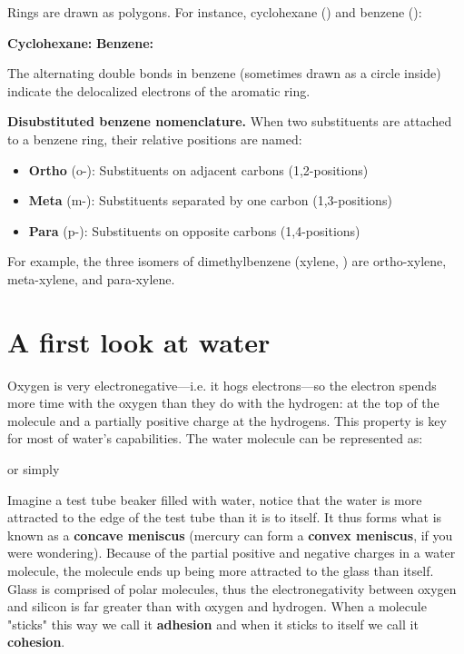 \documentclass{report}
\begin{document}
Rings are drawn as polygons. For instance, cyclohexane () and benzene ():
\begin{center}
\textbf{Cyclohexane:}  \qquad
\textbf{Benzene:} 
\end{center}
The alternating double bonds in benzene (sometimes drawn as a circle inside) indicate the delocalized electrons of the aromatic ring.

\textbf{Disubstituted benzene nomenclature.} When two substituents are attached to a benzene ring, their relative positions are named:
\begin{itemize}
    \item \textbf{Ortho} (o-): Substituents on adjacent carbons (1,2-positions)
    \item \textbf{Meta} (m-): Substituents separated by one carbon (1,3-positions)
    \item \textbf{Para} (p-): Substituents on opposite carbons (1,4-positions)
\end{itemize}
For example, the three isomers of dimethylbenzene (xylene, ) are ortho-xylene, meta-xylene, and para-xylene.

\section{A first look at water}

Oxygen is very electronegative---i.e. it hogs electrons---so the electron spends more time with the oxygen than they do with the hydrogen: at the top of the molecule and a partially positive charge at the hydrogens. This property is key for most of water's capabilities. The water molecule can be represented as:
\begin{center}
\qquad or simply \qquad {}
\end{center}

Imagine a test tube beaker filled with water, notice that the water is more attracted to the edge of the test tube than it is to itself. It thus forms what is known as a \textbf{concave meniscus} (mercury can form a \textbf{convex meniscus}, if you were wondering). Because of the partial positive and negative charges in a water molecule, the molecule ends up being more attracted to the glass than itself. Glass is comprised of polar molecules, thus the electronegativity between oxygen and silicon is far greater than with oxygen and hydrogen. When a molecule "sticks" this way we call it \textbf{adhesion} and when it sticks to itself we call it \textbf{cohesion}. 
\end{document}
